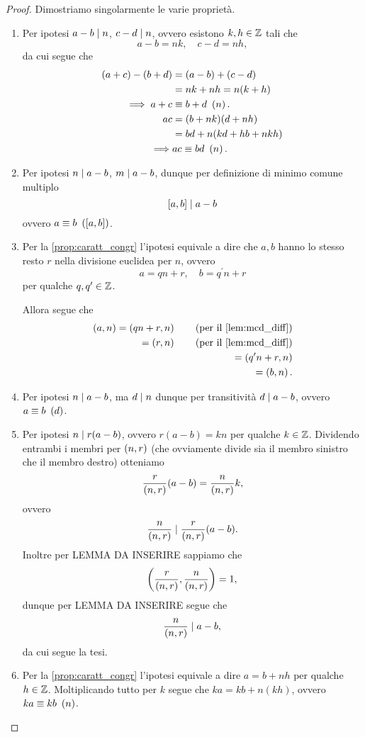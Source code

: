 \begin{proof}
    Dimostriamo singolarmente le varie proprietà.
    \begin{enumerate}[label={(\arabic*)}]
        \item Per ipotesi $a - b \mid n$, $c - d \mid n$, ovvero esistono $k, h \in \mathbb{Z}$ tali che \[
            a - b = nk, \quad c - d = nh,    
        \] da cui segue che 
        \begin{alignat*}{1}
            (a + c) - (b + d) &= (a - b) + (c - d) \\
            &= nk + nh = n(k+h) \\
            \implies a+c &\equiv b+d \ \left(n\right).\\
            ac &= (b + nk)(d +nh)\\
             &= bd + n(kd + hb + nkh) \\
            \implies &ac \equiv bd \ \left(n\right).
        \end{alignat*}
        \item Per ipotesi $n \mid a-b$, $m\mid a - b$, dunque per definizione di minimo comune multiplo \[
            \left[a, b\right] \mid a - b    
        \] ovvero $a \equiv b \ \left(\left[a, b\right]\right)$.
        \item Per la \autoref{prop:caratt_congr} l'ipotesi equivale a dire che $a, b$ hanno lo stesso resto $r$ nella divisione euclidea per $n$, ovvero \[
            a = qn + r, \quad b = q^\prime n + r    
        \] per qualche $q, q^\prime \in \mathbb{Z}$.

        Allora segue che \begin{align*}
            \mcd{a}{n} = \mcd{qn + r}{n} \tag{per il \autoref{lem:mcd_diff}}\\
            = \mcd{r}{n} \tag{per il \autoref{lem:mcd_diff}}\\
            = \mcd{q^\prime n + r}{n}\\ 
            = \mcd{b}{n}.
        \end{align*}
        \item Per ipotesi $n \mid a - b$, ma $d \mid n$ dunque per transitività $d \mid a - b$, ovvero $a \equiv b \ \left(d\right)$.
        \item Per ipotesi $n \mid r(a - b)$, ovvero $r(a-b) = kn$ per qualche $k \in \mathbb{Z}$. Dividendo entrambi i membri per $\left(n, r\right)$ (che ovviamente divide sia il membro sinistro che il membro destro) otteniamo \[
            \frac{r}{\left(n, r\right)}(a-b) = \frac{n}{\left(n, r\right)}k,   
        \] ovvero \[
            \frac{n}{\left(n, r\right)} \mid \frac{r}{\left(n, r\right)}(a-b).
        \] Inoltre per LEMMA DA INSERIRE sappiamo che \[
            \left(\frac{r}{\left(n, r\right)}, \frac{n}{\left(n, r\right)}\right) = 1,    
        \] dunque per LEMMA DA INSERIRE segue che \[
            \frac{n}{\left(n, r\right)} \mid a - b,    
        \] da cui segue la tesi.
        \item Per la \autoref{prop:caratt_congr} l'ipotesi equivale a dire $a = b + nh$ per qualche $h \in \mathbb{Z}$. Moltiplicando tutto per $k$ segue che $ka = kb + n(kh)$, ovvero $ka \equiv kb \ \left(n\right)$.
    \end{enumerate}
\end{proof}

